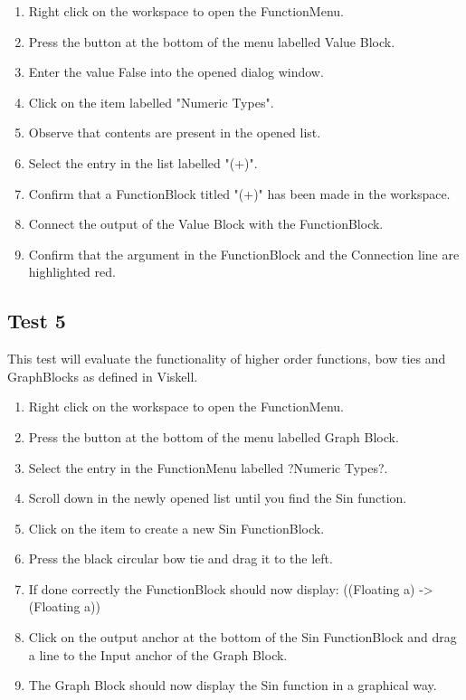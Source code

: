 		\begin{enumerate}
			\item Right click on the workspace to open the FunctionMenu.
			\item Press the button at the bottom of the menu labelled Value Block.
			\item Enter the value False into the opened dialog window.
			\item Click on the item labelled "Numeric Types".
			\item Observe that contents are present in the opened list.
			\item Select the entry in the list labelled "(+)".
			\item Confirm that a FunctionBlock titled "(+)" has been made in the workspace.
			\item Connect the output of the Value Block with the FunctionBlock.
			\item Confirm that the argument in the FunctionBlock and the Connection line are highlighted red.
		\end{enumerate}
	
	\subsection{Test 5}
		This test will evaluate the functionality of higher order functions, bow ties and GraphBlocks as defined in Viskell.
		
		\begin{enumerate}
			\item Right click on the workspace to open the FunctionMenu.
			\item Press the button at the bottom of the menu labelled Graph Block.
			\item Select the entry in the FunctionMenu labelled ?Numeric Types?.
			\item	Scroll down in the newly opened list until you find the Sin function.
			\item Click on the item to create a new Sin FunctionBlock.
			\item Press the black circular bow tie and drag it to the left.
			\item If done correctly the FunctionBlock should now display: ((Floating a) -> (Floating a))
			\item Click on the output anchor at the bottom of the Sin FunctionBlock and drag a line to the Input anchor of the Graph Block.
			\item The Graph Block should now display the Sin function in a graphical way.
		\end{enumerate}

